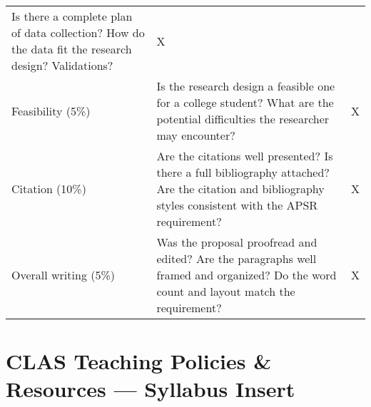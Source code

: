 \documentclass[11pt,]{article}
\theoremstyle{definition}
\theoremstyle{definition}
\theoremstyle{definition}
\theoremstyle{remark}
\begin{document}
\begin{longtable}[]{@{}lll@{}}
\begin{minipage}[t]{0.76\columnwidth}
Is there a complete plan of data collection? How do the data fit the
research design? Validations?\strut
\end{minipage} & \begin{minipage}[t]{0.03\columnwidth}\raggedright\strut
X\strut
\end{minipage}\tabularnewline
\begin{minipage}[t]{0.12\columnwidth}\raggedright\strut
Feasibility (5\%)\strut
\end{minipage} & \begin{minipage}[t]{0.76\columnwidth}\raggedright\strut
Is the research design a feasible one for a college student? What are
the potential difficulties the researcher may encounter?\strut
\end{minipage} & \begin{minipage}[t]{0.03\columnwidth}\raggedright\strut
X\strut
\end{minipage}\tabularnewline
\begin{minipage}[t]{0.12\columnwidth}\raggedright\strut
Citation (10\%)\strut
\end{minipage} & \begin{minipage}[t]{0.76\columnwidth}\raggedright\strut
Are the citations well presented? Is there a full bibliography attached?
Are the citation and bibliography styles consistent with the APSR
requirement?\strut
\end{minipage} & \begin{minipage}[t]{0.03\columnwidth}\raggedright\strut
X\strut
\end{minipage}\tabularnewline
\begin{minipage}[t]{0.12\columnwidth}\raggedright\strut
Overall writing (5\%)\strut
\end{minipage} & \begin{minipage}[t]{0.76\columnwidth}\raggedright\strut
Was the proposal proofread and edited? Are the paragraphs well framed
and organized? Do the word count and layout match the requirement?\strut
\end{minipage} & \begin{minipage}[t]{0.03\columnwidth}\raggedright\strut
X\strut
\end{minipage}\tabularnewline
\bottomrule
\end{longtable}

\clearpage

\section{CLAS Teaching Policies \& Resources --- Syllabus
Insert}\label{clas-teaching-policies-resources-syllabus-insert}
\end{document}
